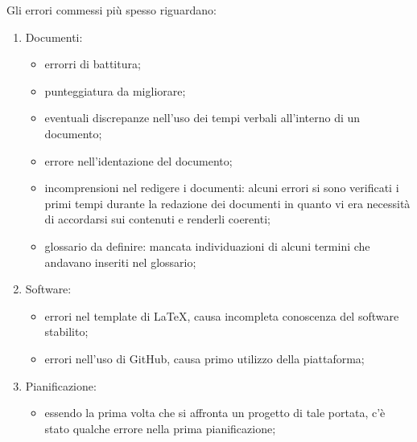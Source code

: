 \documentclass[../piano_di_qualifica.tex]{subfiles}
\begin{document}
Gli errori commessi più spesso riguardano:
\begin{enumerate}
    \item Documenti:
    \begin{itemize}
        \item errorri di battitura; 
        \item punteggiatura da migliorare;
        \item eventuali discrepanze nell'uso dei tempi verbali all'interno di un documento;
        \item errore nell'identazione del documento;
        \item incomprensioni nel redigere i documenti: alcuni errori si sono verificati i primi tempi durante la redazione dei documenti in quanto 
                vi era necessità di accordarsi sui contenuti e renderli coerenti;
        \item glossario da definire: mancata individuazioni di alcuni termini che andavano inseriti nel glossario;
    \end{itemize}
    \item Software:
    \begin{itemize}
        \item errori nel template di \LaTeX, causa incompleta conoscenza del software stabilito;
        \item errori nell'uso di GitHub, causa primo utilizzo della piattaforma;
    \end{itemize}
    \item Pianificazione:
    \begin{itemize}
        \item essendo la prima volta che si affronta un progetto di tale portata, c'è stato qualche errore nella prima pianificazione;
    \end{itemize}
\end{enumerate}
\end{document}
